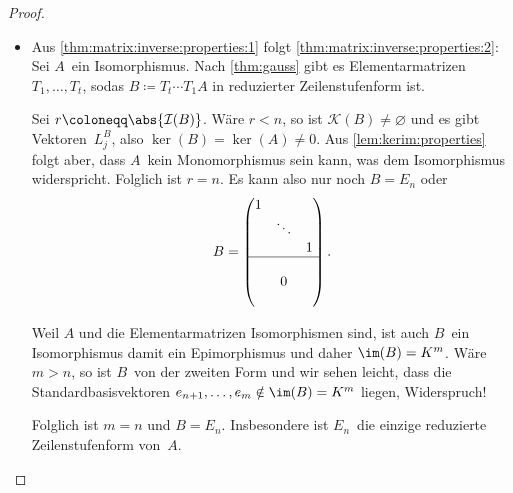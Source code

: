 \documentclass[a4paper]{article}
\begin{document}
\begin{proof}\leavevmode
    \begin{itemize}
        \item Aus \cref{thm:matrix:inverse:properties:1} folgt \cref{thm:matrix:inverse:properties:2}: Sei $A$~ein Isomorphismus. Nach \cref{thm:gauss} gibt es Elementarmatrizen $T_1,\dots,T_t$, sodas $B \coloneqq T_t\cdots T_1A$ in reduzierter Zeilenstufenform ist.

              Sei $r \coloneqq \abs{\mathcal{I}(B)}$. Wäre $r < n$, so ist $\mathcal{K}(B) \neq \varnothing$ und es gibt Vektoren~$L_j^B$, also $\ker(B) = \ker(A) \neq 0$. Aus \cref{lem:kerim:properties} folgt aber, dass $A$~kein Monomorphismus sein kann, was dem Isomorphismus widerspricht. Folglich ist $r = n$. Es kann also nur noch $B = E_n$ oder
              \begin{equation*}
                  B = \begin{pmatrix}
                      1 &        &   \\
                        & \ddots &   \\
                        &        & 1 \\ \hline
                        &        &   \\
                        & 0      &   \\
                        &        &
                  \end{pmatrix}.
              \end{equation*}

              Weil $A$ und die Elementarmatrizen Isomorphismen sind, ist auch $B$~ein Isomorphismus damit ein Epimorphismus und daher $\im(B) = K^m$. Wäre $m > n$, so ist $B$~von der zweiten Form und wir sehen leicht, dass die Standardbasisvektoren $e_{n+1},\dots,e_m \notin \im(B) = K^m$ liegen, Widerspruch!

              Folglich ist $m = n$ und $B = E_n$. Insbesondere ist $E_n$~die einzige reduzierte Zeilenstufenform von~$A$.


\end{itemize}
\end{proof}
\end{document}
